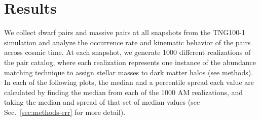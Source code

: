 \documentclass[twocolumn]{aastex631}
\newcommand{\kc}[1]{\textcolor{yellow}{\textbf{kc: #1}} }
\begin{document}



\section{Results}
We collect dwarf pairs and massive pairs at all snapshots from the TNG100-1 simulation and analyze the occurrence rate and kinematic behavior of the pairs across cosmic time. 
At each snapshot, we generate 1000 different realizations of the pair catalog, where each realization represents one instance of the abundance matching technique to assign stellar masses to dark matter halos (see methods). 
In each of the following plots, the median and a percentile spread each value are calculated by finding the median from each of the 1000 AM realizations, and taking the median and spread of that set of median values (see Sec.~\ref{sec:methods-err} for more detail).
\end{document}
